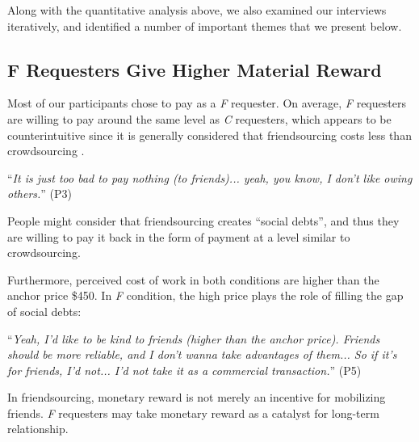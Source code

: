 %



Along with the quantitative analysis above, we also examined our interviews iteratively, 
and identified a number of important themes that we present below.

\subsection{F Requesters Give Higher Material Reward}
Most of our participants chose to pay as a \emph{F} requester.
On average, \emph{F} requesters are willing to pay around the same level as \emph{C} requesters, 
which appears to be counterintuitive since it is generally considered that 
friendsourcing costs less than crowdsourcing \cite{Rzeszotarski:CHI14:SocialCost}. 

``\emph{It is just too bad to pay nothing (to friends)... yeah, you know, I don't like owing others.}'' (P3)

People might consider that friendsourcing creates ``social debts'', 
and thus they are willing to pay it back in the form of payment at a level similar to crowdsourcing.

Furthermore, perceived cost of work in both conditions are higher than the anchor price \$450. 
In \emph{F} condition, the high price plays the role of filling the gap of social debts:

``\emph{Yeah, I'd like to be kind to friends (higher than the anchor price). 
Friends should be more reliable, and I don't wanna take advantages of them... 
So if it's for friends, I'd not... I'd not take it as a commercial transaction.}'' (P5)

In friendsourcing, monetary reward is not merely an incentive for mobilizing friends. 
\emph{F} requesters may take monetary reward as a catalyst for long-term relationship.

